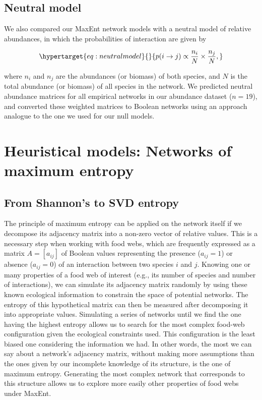 \documentclass[10pt,oneside]{article}
\begin{document}
\hypertarget{neutral-model}{%
\subsection{Neutral model}\label{neutral-model}}

We also compared our MaxEnt network models with a neutral model of
relative abundances, in which the probabilities of interaction are given
by

\begin{equation}\protect\hypertarget{eq:neutralmodel}{}{p(i \rightarrow j) \propto \frac{n_i}{N} \times \frac{n_j}{N},}\label{eq:neutralmodel}\end{equation}

where \(n_i\) and \(n_j\) are the abundances (or biomass) of both
species, and \(N\) is the total abundance (or biomass) of all species in
the network. We predicted neutral abundance matrices for all empirical
networks in our abundance dataset (\(n = 19\)), and converted these
weighted matrices to Boolean networks using an approach analogue to the
one we used for our null models.

\hypertarget{heuristical-models-networks-of-maximum-entropy}{%
\section{Heuristical models: Networks of maximum
entropy}\label{heuristical-models-networks-of-maximum-entropy}}

\hypertarget{from-shannons-to-svd-entropy}{%
\subsection{From Shannon's to SVD
entropy}\label{from-shannons-to-svd-entropy}}

The principle of maximum entropy can be applied on the network itself if
we decompose its adjacency matrix into a non-zero vector of relative
values. This is a necessary step when working with food webs, which are
frequently expressed as a matrix \(A = [a_{ij}]\) of Boolean values
representing the presence (\(a_{ij} = 1\)) or absence (\(a_{ij} = 0\))
of an interaction between two species \(i\) and \(j\). Knowing one or
many properties of a food web of interest (e.g., its number of species
and number of interactions), we can simulate its adjacency matrix
randomly by using these known ecological information to constrain the
space of potential networks. The entropy of this hypothetical matrix can
then be measured after decomposing it into appropriate values.
Simulating a series of networks until we find the one having the highest
entropy allows us to search for the most complex food-web configuration
given the ecological constraints used. This configuration is the least
biased one considering the information we had. In other words, the most
we can say about a network's adjacency matrix, without making more
assumptions than the ones given by our incomplete knowledge of its
structure, is the one of maximum entropy. Generating the most complex
network that corresponds to this structure allows us to explore more
easily other properties of food webs under MaxEnt.
\end{document}
